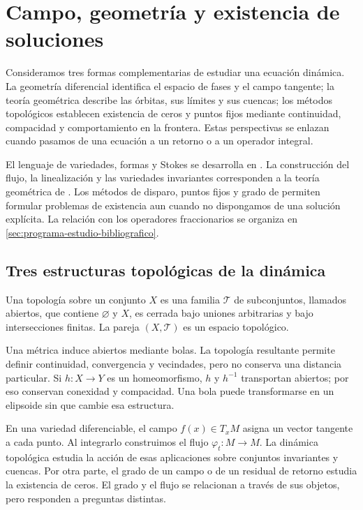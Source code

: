 \section{Campo, geometría y existencia de soluciones}
\label{sec:ruta-geometrica-libros}

Consideramos tres formas complementarias de estudiar una ecuación dinámica.
La geometría diferencial identifica el espacio de fases y el campo tangente;
la teoría geométrica describe las órbitas, sus límites y sus cuencas; los
métodos topológicos establecen existencia de ceros y puntos fijos mediante
continuidad, compacidad y comportamiento en la frontera. Estas perspectivas
se enlazan cuando pasamos de una ecuación a un retorno o a un operador
integral.

El lenguaje de variedades, formas y Stokes se desarrolla en
\cite{NahmadAchar2022Topologia}. La construcción del flujo, la linealización
y las variedades invariantes corresponden a la teoría geométrica de
\cite{JaurezEtAl2021TGEDI,JaurezEtAl2021TGEDII}. Los métodos de disparo,
puntos fijos y grado de \cite{Amster2021MetodosTopologicos} permiten formular
problemas de existencia aun cuando no dispongamos de una solución explícita.
La relación con los operadores fraccionarios se organiza en
\cref{sec:programa-estudio-bibliografico}.

\subsection{Tres estructuras topológicas de la dinámica}

\begin{definition}
Una topología sobre un conjunto \(X\) es una familia \(\mathcal T\) de
subconjuntos, llamados abiertos, que contiene \(\varnothing\) y \(X\), es
cerrada bajo uniones arbitrarias y bajo intersecciones finitas. La pareja
\((X,\mathcal T)\) es un espacio topológico.
\end{definition}

Una métrica induce abiertos mediante bolas. La topología resultante permite
definir continuidad, convergencia y vecindades, pero no conserva una distancia
particular. Si \(h:X\to Y\) es un homeomorfismo, \(h\) y \(h^{-1}\)
transportan abiertos; por eso conservan conexidad y compacidad. Una bola
puede transformarse en un elipsoide sin que cambie esa estructura.

En una variedad diferenciable, el campo \(f(x)\in T_xM\) asigna un vector
tangente a cada punto. Al integrarlo construimos el flujo
\(\varphi_t:M\to M\). La dinámica topológica estudia la acción de esas
aplicaciones sobre conjuntos invariantes y cuencas. Por otra parte, el grado
de un campo o de un residual de retorno estudia la existencia de ceros. El
grado y el flujo se relacionan a través de sus objetos, pero responden a
preguntas distintas.

